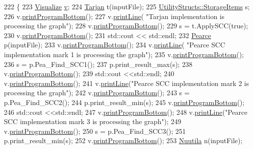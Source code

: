 \begin{DoxyCode}
222                                                  \{
223     \hyperlink{class_visualize}{Visualize} \hyperlink{class_analyzer_ae32079d0816589617a0c76b1d4cf881b}{v};
224     \hyperlink{class_tarjan}{Tarjan} t(inputFile);
225     \hyperlink{struct_utility_structs_1_1_storage_items}{UtilityStructs::StorageItems} s;
226     v.\hyperlink{class_visualize_ac0be9ece2d80a7d1e34724fb87424216}{printProgramBottom}();
227     v.\hyperlink{class_visualize_abce6cd538dc0715b21851e0bf0377d85}{printLine}( \textcolor{stringliteral}{"Tarjan implementation is processing the graph"});
228     v.\hyperlink{class_visualize_ac0be9ece2d80a7d1e34724fb87424216}{printProgramBottom}();
229     s = t.ApplySCC(\textcolor{keyword}{true});
230     v.\hyperlink{class_visualize_ac0be9ece2d80a7d1e34724fb87424216}{printProgramBottom}();
231     std::cout << std::endl;
232     \hyperlink{class_pearce}{Pearce} p(inputFile);
233     v.\hyperlink{class_visualize_ac0be9ece2d80a7d1e34724fb87424216}{printProgramBottom}();
234     v.\hyperlink{class_visualize_abce6cd538dc0715b21851e0bf0377d85}{printLine}( \textcolor{stringliteral}{"Pearce SCC implementation mark 1 is processing the graph"});
235     v.\hyperlink{class_visualize_ac0be9ece2d80a7d1e34724fb87424216}{printProgramBottom}();
236     s = p.Pea\_Find\_SCC1();
237     p.print\_result\_max(s);
238     v.\hyperlink{class_visualize_ac0be9ece2d80a7d1e34724fb87424216}{printProgramBottom}();
239     std::cout <<std::endl;
240     v.\hyperlink{class_visualize_ac0be9ece2d80a7d1e34724fb87424216}{printProgramBottom}();
241     v.\hyperlink{class_visualize_abce6cd538dc0715b21851e0bf0377d85}{printLine}(\textcolor{stringliteral}{"Pearce SCC implementation mark 2 is processing the graph"});
242     v.\hyperlink{class_visualize_ac0be9ece2d80a7d1e34724fb87424216}{printProgramBottom}();
243     s = p.Pea\_Find\_SCC2();
244     p.print\_result\_min(s);
245     v.\hyperlink{class_visualize_ac0be9ece2d80a7d1e34724fb87424216}{printProgramBottom}();
246     std::cout <<std::endl;
247     v.\hyperlink{class_visualize_ac0be9ece2d80a7d1e34724fb87424216}{printProgramBottom}();
248     v.\hyperlink{class_visualize_abce6cd538dc0715b21851e0bf0377d85}{printLine}(\textcolor{stringliteral}{"Pearce SCC implementation mark 3 is processing the graph"});
249     v.\hyperlink{class_visualize_ac0be9ece2d80a7d1e34724fb87424216}{printProgramBottom}();
250     s = p.Pea\_Find\_SCC3();
251     p.print\_result\_min(s);
252     v.\hyperlink{class_visualize_ac0be9ece2d80a7d1e34724fb87424216}{printProgramBottom}();
253     \hyperlink{class_nuutila}{Nuutila} n(inputFile);

\end{DoxyCode}
